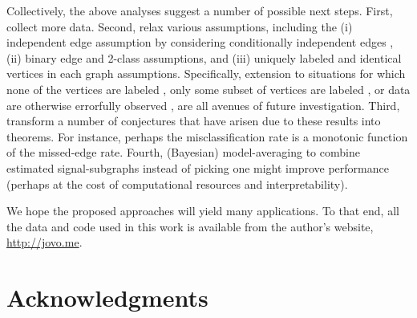 \documentclass[10pt,journal,cspaper,compsoc]{IEEEtran}
\begin{document}
Collectively, the above analyses suggest a number of possible next steps.  First, collect more data.  Second, relax various assumptions, including the (i)  independent edge assumption by considering conditionally independent edges \cite{Hoff02,Sussman2012,Fishkind2012}, (ii) binary edge and 2-class assumptions, and (iii) uniquely labeled and identical vertices in each graph  assumptions. 
Specifically, extension to situations for which none of the vertices are labeled \cite{VP11_QAP, VP11_unlabeled},  only some subset of vertices are labeled \cite{coppersmith2012vertex,VN,BVN}, or data are otherwise errorfully observed \cite{Bock2011}, are all avenues of future investigation.
Third, transform a number of conjectures that have arisen due to these results into theorems.  For instance, perhaps the misclassification rate is a monotonic function of the missed-edge rate.  Fourth, (Bayesian) model-averaging to combine estimated signal-subgraphs instead of picking one might improve performance (perhaps at the cost of computational resources and interpretability).  

We hope the proposed approaches will yield many applications.  To that end, all the data and code used in this work is available from the author's website, \url{http://jovo.me}.  

% 
% 
% 


% 

\ifCLASSOPTIONcompsoc
  \section*{Acknowledgments}
\else
\end{document}
